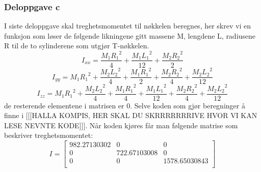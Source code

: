 \subsubsection{Deloppgave c}
I siste deloppgave skal treghetsmomentet til nøkkelen beregnes, her skrev vi en funksjon som løser de følgende likningene gitt massene M, lengdene L, radiusene R til de to sylinderene som utgjør T-nøkkelen. \begin{equation}
    I_{xx}= \frac{M_1{R_1}^2}{4} + \frac{M_1{L_1}^2}{12} + \frac{M_2{R_2}^2}{2}
\end{equation}
\begin{equation}
    I_{yy}= M_1{R_1}^2 + \frac{M_2{L_2}^2}{4} + \frac{M_1{R_1}^2}{2} + \frac{M_2{R_2}^2}{4} + \frac{M_2{L_2}^2}{12}
\end{equation}
\begin{equation}
    I_{zz}= M_1{R_1}^2 + \frac{M_2{L_2}^2}{4} + \frac{M_1{R_1}^2}{4} + \frac{M_1{L_1}^2}{12} + \frac{M_2{R_2}^2}{4} + \frac{M_2{L_2}^2}{12}
\end{equation} 
\newline
de resterende elementene i matrisen er 0. Selve koden som gjør beregninger å finne i [[[HALLA KOMPIS, HER SKAL DU SKRRRRRRRIVE HVOR VI KAN LESE NEVNTE KODE]]]. Når koden kjøres får man følgende matrise som beskriver treghetsmomentet: \newline
\begin{equation}
I = 
\begin{bmatrix}
982.27130302 & 0 & 0\\
0 & 722.67103008 & 0\\
0 & 0 & 1578.65030843\\
\end{bmatrix}
\end{equation}